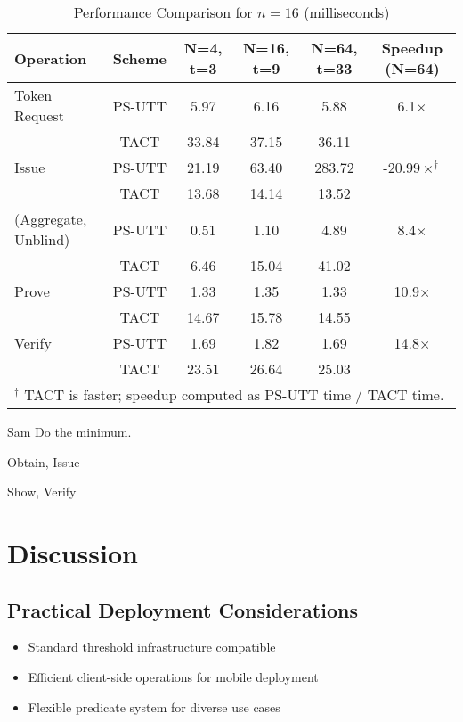 \begin{table}[htbp]
\centering
\caption[Threshold ABC Performance Comparison, fixed attribute length, varying number of nodes]{Performance Comparison for $n = 16$ (milliseconds)}
\begin{tabular}{lccccc}
\toprule
\textbf{Operation} & \textbf{Scheme} & \textbf{N=4, t=3} & \textbf{N=16, t=9} & \textbf{N=64, t=33} & \textbf{Speedup (N=64)} \\
\midrule
Token Request & PS-UTT & 5.97 & 6.16 & 5.88 & 6.1$\times$ \\
              & TACT   & 33.84 & 37.15 & 36.11 & \\
\midrule
Issue         & PS-UTT & 21.19 & 63.40 & 283.72 & -20.99$\times^\dagger$ \\
              & TACT   & 13.68 & 14.14 & 13.52 & \\
\midrule
(Aggregate, Unblind) & PS-UTT & 0.51 & 1.10 & 4.89 & 8.4$\times$ \\
                     & TACT   & 6.46 & 15.04 & 41.02 & \\
\midrule
Prove         & PS-UTT & 1.33 & 1.35 & 1.33 & 10.9$\times$\\
              & TACT   & 14.67 & 15.78 & 14.55 & \\
\midrule
Verify        & PS-UTT & 1.69 & 1.82 & 1.69 & 14.8$\times$ \\
              & TACT   & 23.51 & 26.64 & 25.03 & \\
\bottomrule
\multicolumn{6}{l}{\small $^\dagger$ TACT is faster; speedup computed as PS-UTT time / TACT time.}
\end{tabular}
\label{tab:perf-comp-vary-N}

\end{table}




Sam
Do the minimum.

Obtain, Issue

Show, Verify









\section{Discussion}
\label{sec:threshold-discussion}

\subsection{Practical Deployment Considerations}
\begin{itemize}
    \item Standard threshold infrastructure compatible
    \item Efficient client-side operations for mobile deployment
    \item Flexible predicate system for diverse use cases
\end{itemize}

